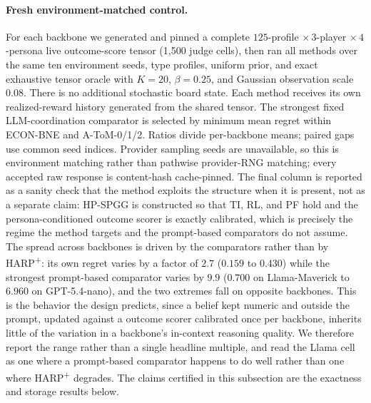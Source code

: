 \paragraph{Fresh environment-matched control.}
For each backbone we generated and pinned a complete $125$-profile ${\times}\,3$-player ${\times}\,4$-persona live outcome-score tensor (1,500 judge cells), then ran all methods over the same ten environment seeds, type profiles, uniform prior, and exact exhaustive tensor oracle with $K{=}20$, $\beta{=}0.25$, and Gaussian observation scale $0.08$. There is no additional stochastic board state. Each method receives its own realized-reward history generated from the shared tensor. The strongest fixed LLM-coordination comparator is selected by minimum mean regret within ECON-BNE and A-ToM-0/1/2. Ratios divide per-backbone means; paired gaps use common seed indices. Provider sampling seeds are unavailable, so this is environment matching rather than pathwise provider-RNG matching; every accepted raw response is content-hash cache-pinned. The final column is reported as a sanity check that the method exploits the structure when it is present, not as a separate claim: HP-SPGG is constructed so that TI, RL, and PF hold and the persona-conditioned outcome scorer is exactly calibrated, which is precisely the regime the method targets and the prompt-based comparators do not assume. The spread across backbones is driven by the comparators rather than by HARP\textsuperscript{+}: its own regret varies by a factor of $2.7$ ($0.159$ to $0.430$) while the strongest prompt-based comparator varies by $9.9$ ($0.700$ on Llama-Maverick to $6.960$ on GPT-5.4-nano), and the two extremes fall on opposite backbones. This is the behavior the design predicts, since a belief kept numeric and outside the prompt, updated against a outcome scorer calibrated once per backbone, inherits little of the variation in a backbone's in-context reasoning quality. We therefore report the range rather than a single headline multiple, and read the Llama cell as one where a prompt-based comparator happens to do well rather than one where HARP\textsuperscript{+} degrades. The claims certified in this subsection are the exactness and storage results below.

